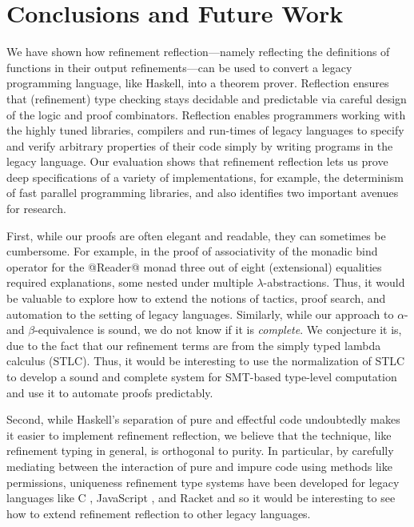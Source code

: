 \section{Conclusions and Future Work}

We have shown how refinement reflection---namely
reflecting the definitions of functions in their
output refinements---can be used to convert a
legacy programming language, like Haskell,
into a theorem prover.
%
Reflection ensures that (refinement) type checking
stays decidable and predictable via careful design
of the logic and proof combinators.
%
Reflection enables programmers working with
the highly tuned libraries, compilers and
run-times of legacy languages to specify
and verify arbitrary properties of their
code simply by writing programs in the
legacy language.
%
Our evaluation shows that refinement reflection
lets us prove deep specifications of a variety
of implementations, for example, the determinism
of fast parallel programming libraries, and also
identifies two important avenues for research.

First, while our proofs are often elegant
and readable, they can sometimes be cumbersome.
For example, in the proof of associativity of
the monadic bind operator for the @Reader@ monad
three out of eight (extensional) equalities required
explanations, some nested under multiple
$\lambda$-abstractions. Thus, it would be
valuable to explore how to extend the notions
of tactics, proof search, and automation
to the setting of legacy languages.
%
Similarly, while our approach to $\alpha$- and
$\beta$-equivalence is sound, we do not know
if it is \emph{complete}. We conjecture it is,
due to the fact that our refinement terms
are from the simply typed lambda calculus (STLC).
Thus, it would be interesting to use the
normalization of STLC to develop a sound
and complete system for SMT-based type-level
computation and use it to automate proofs
predictably.

Second, while Haskell's separation of pure
and effectful code undoubtedly makes it
easier to implement refinement reflection,
we believe that the technique, like
refinement typing in general, is orthogonal
to purity.
In particular, by carefully mediating
between the interaction of pure and
impure code using methods like
permissions, uniqueness \etc
refinement type systems have been
developed for legacy languages
like C \cite{LiquidPOPL10},
JavaScript \cite{Chugh2012, Vekris16},
and Racket \cite{RefinedRacket}
and so it would be interesting
to see how to extend refinement
reflection to other legacy languages.

